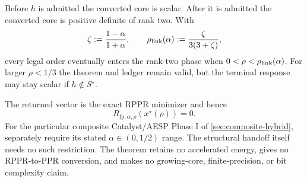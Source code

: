 \begin{theorem}
Before $h$ is admitted the converted core is scalar.  After it is admitted
the converted core is positive definite of rank two.  With
\begin{equation}
 \zeta:=\frac{1-\alpha}{1+\alpha},
 \qquad
 \rho_{\rm link}(\alpha):=\frac{\zeta}{3(3+\zeta)},
 \label{eq:double-y-composite-link-threshold}
\end{equation}
every legal order eventually enters the rank-two phase when
$0<\rho<\rho_{\rm link}(\alpha)$.  For larger $\rho<1/3$ the theorem and
ledger remain valid, but the terminal response may stay scalar if
$h\notin S^\star$.

The returned vector is the exact RPPR minimizer and hence
\begin{equation}
 R_{\mathrm{fp},\alpha,\rho}(x^\star(\rho))=0.
 \label{eq:double-y-composite-terminal-proximal}
\end{equation}
For the particular composite Catalyst/AESP Phase I of
\cref{sec:composite-hybrid}, separately require its stated
$\alpha\in(0,1/2)$ range.  The structural handoff itself needs no such
restriction.  The theorem retains no accelerated energy, gives no
RPPR-to-PPR conversion, and makes no growing-core, finite-precision, or bit
complexity claim.
\end{theorem}

